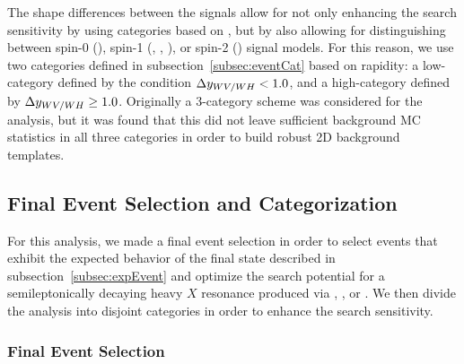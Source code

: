The shape differences between the \VBF signals allow for not only enhancing the search sensitivity by using categories based on \Dy, but by also allowing for distinguishing between spin-0 (\RadtoWW), spin-1 (\ZprtoWW, \WprtoWZ, \WprtoWH), or spin-2 (\GBulktoWW) \VBF signal models.
For this reason, we use two categories defined in subsection~\ref{subsec:eventCat} based on rapidity: a low-\Dy category defined by the condition $\Delta y_{WV/WH}<1.0$, and a high-\Dy category defined by $\Delta y_{WV/WH}\geq1.0$.
Originally a 3-category scheme was considered for the analysis, but it was found that this did not leave sufficient background MC statistics in all three categories in order to build robust 2D background templates.

\subsection{Final Event Selection and Categorization}
\label{subsec:eventSelect}

For this analysis, we made a final event selection in order to select events that exhibit the expected behavior of the final state described in subsection~\ref{subsec:expEvent} and optimize the search potential for a semileptonically decaying heavy $X$ resonance produced via \ggF, \DY, or \VBF.
We then divide the analysis into disjoint categories in order to enhance the search sensitivity.

\subsubsection{Final Event Selection}

